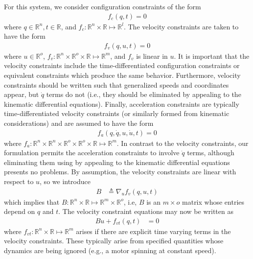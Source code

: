 For this system, we consider configuration constraints of the form
\begin{align}
\label{eq:configuration_constraints}
f_c(q, t) = 0
\end{align}
where $q\in\mathbb{R}^n, t\in\mathbb{R}$, and $f_c : \mathbb{R}^n \times
\mathbb{R} \mapsto \mathbb{R}^l$.  The velocity constraints are taken to have
the form
\begin{align}
\label{eq:velocity_constraints}
f_v(q, u, t) = 0
\end{align}
where $u\in\mathbb{R}^o$, $f_v : \mathbb{R}^n \times \mathbb{R}^o \times
\mathbb{R} \mapsto \mathbb{R}^m$, and $f_v$ is linear in $u$.  It is important
that the velocity constraints include the time-differentiated configuration
constraints or equivalent constraints which produce the same behavior.
Furthermore, velocity constraints should be written such that generalized
speeds and coordinates appear, but $\dot{q}$ terms do not (i.e., they should be
eliminated by appealing to the kinematic differential equations). Finally,
acceleration constraints are typically time-differentiated velocity constraints
(or similarly formed from kinematic considerations) and are assumed to have the
form
\begin{align}
  \label{eq:acceleration_constraints}
  f_a(q, \dot{q}, u, \dot{u}, t) = 0
\end{align}
where $f_a : \mathbb{R}^n \times \mathbb{R}^n \times \mathbb{R}^o \times
\mathbb{R}^o \times \mathbb{R} \mapsto \mathbb{R}^m$. In contrast to the
velocity constraints, our formulation permits the acceleration constraints to
involve $\dot{q}$ terms, although eliminating them using by appealing to the
kinematic differential equations presents no problems. By assumption, the
velocity constraints are linear with respect to $u$, so we introduce
\begin{align}
\label{eq:constraint_B}
  B &\triangleq \nabla_u f_v (q, u, t)
\end{align}
which implies that $B : \mathbb{R}^n \times \mathbb{R} \mapsto \mathbb{R}^m
\times \mathbb{R}^o$, i.e, $B$ is an $m \times o$ matrix whose entries depend
on $q$ and $t$. The velocity constraint equations may now be written as
\begin{align}
\label{eq:constraint_Bu0}
B u + f_{vt}(q, t) &= 0
\end{align}
where $f_{vt} : \mathbb{R}^n \times \mathbb{R} \mapsto \mathbb{R}^m$ arises if
there are explicit time varying terms in the velocity constraints. These
typically arise from specified quantities whose dynamics are being ignored
(e.g., a motor spinning at constant speed).

